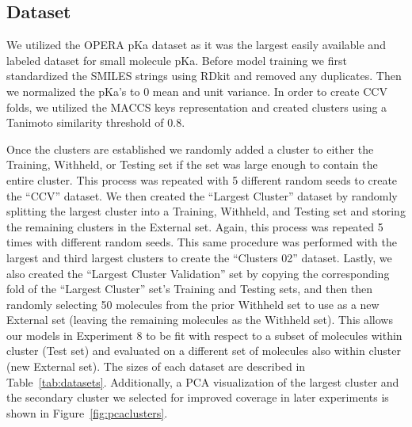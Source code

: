 \documentclass[journal=jmcmar,manuscript=article]{achemso}
\begin{document}
\subsection{Dataset}
We utilized the OPERA pKa dataset\cite{operapKa} as it was the largest easily available and labeled dataset for small molecule pKa. Before model training we first standardized the SMILES\cite{smiles} strings using RDkit\cite{rdkit} and removed any duplicates. Then we normalized the pKa's to 0 mean and unit variance. In order to create CCV folds, we utilized the MACCS keys \cite{maccskeys} representation and created clusters using a Tanimoto similarity threshold of 0.8.

Once the clusters are established we randomly added a cluster to either the Training, Withheld, or Testing set if the set was large enough to contain the entire cluster. This process was repeated with 5 different random seeds to create the ``CCV'' dataset. We then created the ``Largest Cluster'' dataset by randomly splitting the largest cluster into a Training, Withheld, and Testing set and storing the remaining clusters in the External set. Again, this process was repeated 5 times with different random seeds. This same procedure was performed with the largest and third largest clusters to create the ``Clusters 02'' dataset. Lastly, we also created the ``Largest Cluster Validation'' set by copying the corresponding fold of the ``Largest Cluster'' set's Training and Testing sets, and then then randomly selecting 50 molecules from the prior Withheld set to use as a new External set (leaving the remaining molecules as the Withheld set). This allows our models in Experiment 8 to be fit with respect to a subset of molecules within cluster (Test set) and evaluated on a different set of molecules also within cluster (new External set). The sizes of each dataset are described in Table~\ref{tab:datasets}. Additionally, a PCA visualization of the largest cluster and the secondary cluster we selected for improved coverage in later experiments is shown in Figure~\ref{fig:pcaclusters}.
\end{document}
